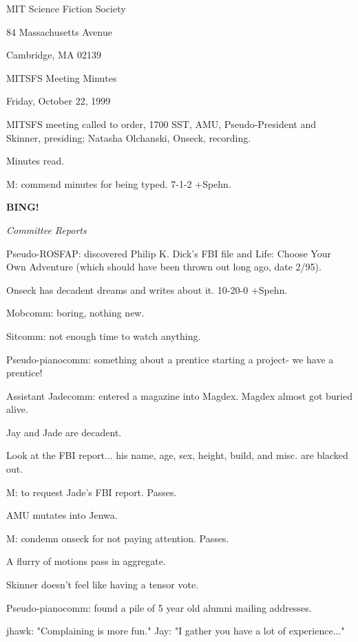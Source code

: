 \documentclass[12pt]{article}
\newcommand{\bing}{{\bf BING!} }
\newcommand{\goto}[1]{\bing \vskip 12pt \centerline{{\em{#1}}}}
\begin{document}
\begin{center}

MIT Science Fiction Society 

84 Massachusetts Avenue

Cambridge, MA 02139

\vspace{12pt}

MITSFS Meeting Minutes 

Friday, October 22, 1999

\end{center}
 
\vspace{18pt}

\setlength{\parskip}{6pt}

\noindent
MITSFS meeting called to order, 1700 SST,
AMU, Pseudo-President and Skinner, presiding; Natasha Olchanski, Onseck, recording.

Minutes read.

M: commend minutes for being typed. 7-1-2 +Spehn.

\goto{Committee Reports}

Pseudo-ROSFAP: discovered Philip K. Dick's FBI file and Life: Choose Your Own Adventure (which should have been thrown out long ago, date 2/95).

Onseck has decadent dreams and writes about it. 10-20-0 +Spehn.

Mobcomm: boring, nothing new.

Sitcomm: not enough time to watch anything.

Pseudo-pianocomm: something about a prentice starting a project- we have a prentice!

Assistant Jadecomm: entered a magazine into Magdex. Magdex almost got buried alive.

Jay and Jade are decadent.

Look at the FBI report... his name, age, sex, height, build, and misc. are blacked out.

M: to request Jade's FBI report. Passes.

AMU mutates into Jenwa.

M: condemn onseck for not paying attention. Passes.

A flurry of motions pass in aggregate.

Skinner doesn't feel like having a tensor vote.

Pseudo-pianocomm: found a pile of 5 year old alumni mailing addresses.

jhawk: "Complaining is more fun." Jay: "I gather you have a lot of experience..."
\end{document}
